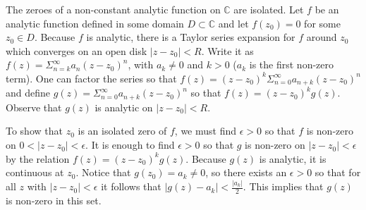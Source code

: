 \documentclass[12pt]{article}
\begin{document}
The zeroes of a non-constant analytic function on ${\mathbb C}$ are isolated. 
Let $f$ be an analytic function 
defined in some domain $D \subset {\mathbb C}$ and 
let $f(z_0)=0$ for some $z_0 \in D$. Because $f$ is analytic, 
there is a Taylor series expansion for $f$ around $z_0$ which 
converges on an open disk $|z-z_0|<R$. Write it as 
$f(z) = \Sigma_{n=k}^{\infty} a_n (z-z_0)^n$, with $a_k \ne 0$ and $k > 0$ 
($a_k$ is the first non-zero term). 
One can factor the series so that 
$f(z) = (z-z_0)^k \Sigma_{n=0}^{\infty} a_{n+k} (z-z_0)^n$ and define 
$g(z) = \Sigma_{n=0}^{\infty} a_{n+k} (z-z_0)^n$ so that $f(z) = (z-z_0)^k g(z)$. 
Observe that $g(z)$ is analytic on $|z-z_0|<R$. 

To show that $z_0$ is an isolated zero of $f$, 
we must find $\epsilon > 0$ so that $f$ is non-zero on $0<|z-z_0|<\epsilon$. 
It is enough to find $\epsilon>0$ so that $g$ is non-zero 
on $|z-z_0|<\epsilon$ by the relation $f(z) = (z-z_0)^k g(z)$. 
Because $g(z)$ is analytic, it is continuous at $z_0$. 
Notice that $g(z_0)=a_k \ne 0$, 
so there exists an $\epsilon > 0$ so that for all $z$ with
$|z-z_0| < \epsilon$ it follows that $|g(z) - a_k| < \frac{|a_k|}{2}$. 
This implies that $g(z)$ is non-zero in this set.
\end{document}
